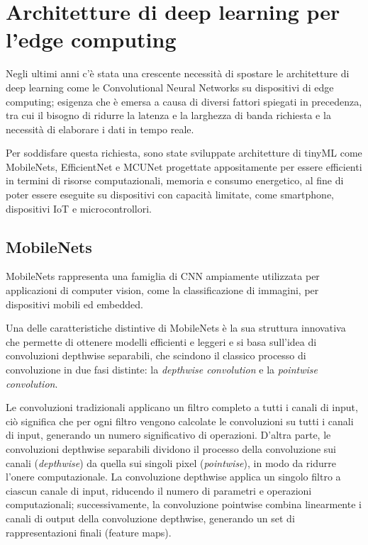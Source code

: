 
\section{Architetture di deep learning per l'edge computing}

Negli ultimi anni c'è stata una crescente necessità di spostare le architetture di deep learning come le Convolutional Neural Networks su dispositivi di edge computing; esigenza che è emersa a causa di diversi fattori spiegati in precedenza, tra cui il bisogno di ridurre la latenza e la larghezza di banda richiesta e la necessità di elaborare i dati in tempo reale.

Per soddisfare questa richiesta, sono state sviluppate architetture di tinyML come MobileNets, EfficientNet e MCUNet progettate appositamente per essere efficienti in termini di risorse computazionali, memoria e consumo energetico, al fine di poter essere eseguite su dispositivi con capacità limitate, come smartphone, dispositivi IoT e microcontrollori.
\cite{MobileNets}
\cite{EfficientNet}
\cite{MCUNet}

\subsection{MobileNets}
\label{sec:mobilenets}

MobileNets rappresenta una famiglia di CNN ampiamente utilizzata per applicazioni di computer vision, come la classificazione di immagini, per dispositivi mobili ed embedded. 

Una delle caratteristiche distintive di MobileNets è la sua struttura innovativa che permette di ottenere modelli efficienti e leggeri e si basa sull'idea di convoluzioni depthwise separabili, che scindono il classico processo di convoluzione in due fasi distinte: la \textit{depthwise convolution} e la \textit{pointwise convolution}. 

Le convoluzioni tradizionali applicano un filtro completo a tutti i canali di input, ciò significa che per ogni filtro vengono calcolate le convoluzioni su tutti i canali di input, generando un numero significativo di operazioni. D'altra parte, le convoluzioni depthwise separabili dividono il processo della convoluzione sui canali (\textit{depthwise}) da quella sui singoli pixel (\textit{pointwise}), in modo da ridurre l'onere computazionale. La convoluzione depthwise applica un singolo filtro a ciascun canale di input, riducendo il numero di parametri e operazioni computazionali; successivamente, la convoluzione pointwise combina linearmente i canali di output della convoluzione depthwise, generando un set di rappresentazioni finali (feature maps).

